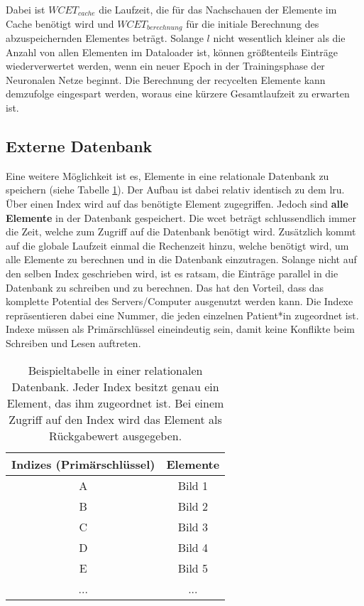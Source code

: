 Dabei ist $WCET_{cache}$ die Laufzeit, die für das Nachschauen der Elemente im Cache benötigt wird und $WCET_{berechnung}$ für die initiale Berechnung des abzuspeichernden Elementes beträgt. Solange $l$ nicht wesentlich kleiner als die Anzahl von allen Elementen im Dataloader ist, können größtenteils Einträge wiederverwertet werden, wenn ein neuer Epoch in der Trainingsphase der Neuronalen Netze beginnt. Die Berechnung der recycelten Elemente kann demzufolge eingespart werden, woraus eine kürzere Gesamtlaufzeit zu erwarten ist.




\subsection{Externe Datenbank}\label{database}
Eine weitere Möglichkeit ist es, Elemente in eine relationale Datenbank zu speichern (siehe Tabelle \ref{cap:database}). Der Aufbau ist dabei relativ identisch zu dem \ac{lru}. Über einen Index wird auf das benötigte Element zugegriffen. Jedoch sind \textbf{alle Elemente} in der Datenbank gespeichert. Die \ac{wcet} beträgt schlussendlich immer die Zeit, welche zum Zugriff auf die Datenbank benötigt wird. Zusätzlich kommt auf die globale Laufzeit einmal die Rechenzeit hinzu, welche benötigt wird, um alle Elemente zu berechnen und in die Datenbank einzutragen. Solange nicht auf den selben Index geschrieben wird, ist es ratsam, die Einträge parallel in die Datenbank zu schreiben und zu berechnen. Das hat den Vorteil, dass das komplette Potential des Servers/Computer ausgenutzt werden kann. Die Indexe repräsentieren dabei eine Nummer, die jeden einzelnen Patient*in zugeordnet ist. Indexe müssen als Primärschlüssel eineindeutig sein, damit keine Konflikte beim Schreiben und Lesen auftreten.

\begin{table}[h]\vspace{1ex}\centering
  \begin{tabular*}{9cm}{c|c}
  \textbf{Indizes (Primärschlüssel)} & \textbf{Elemente}
  \\\hline
  A   &  Bild 1 \\
  B   &  Bild 2 \\
  C   &  Bild 3 \\
  D   &  Bild 4 \\
  E   &  Bild 5 \\
  ... & ...

  \\\hline
  \end{tabular*}
  \caption[Beispieltabelle einer relationalen Datenbank]{Beispieltabelle in einer relationalen Datenbank. Jeder Index besitzt genau ein Element, das ihm zugeordnet ist. Bei einem Zugriff auf den Index wird das Element als Rückgabewert ausgegeben.}\label{cap:database}
\vspace{2ex}\end{table}\label{table:database}


